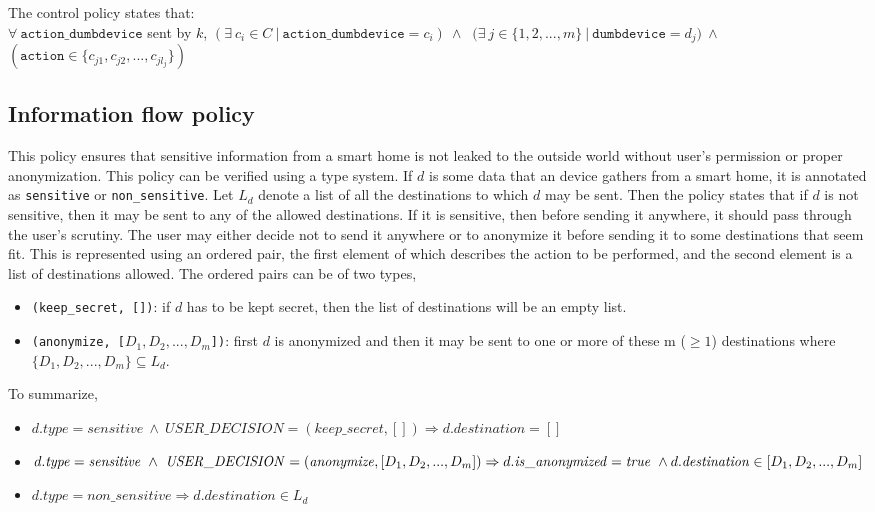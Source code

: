 \documentclass{article}
\begin{document}
\noindent The control policy states that:\\
\noindent $\forall~\mathit{\texttt{action\_dumbdevice}}$ sent by $k$, 
$(\exists~ c_i \in C~|~\texttt{action\_dumbdevice} = c_i)~\wedge~$
$ (\exists~ j \in \{1, 2, ..., m\}~|~ \mathit{\texttt{dumbdevice} = d_j)}~\wedge$\\$(\texttt{action} \in \{c_{j1}, c_{j2}, ..., c_{jl_j}\})$


\subsection{Information flow policy}
\label{subsec:information}
This policy ensures that sensitive information from a smart home is not leaked to the outside world without user's permission or proper anonymization.
This policy can be verified using a type system. If $d$ is some data that an device gathers from a smart home, it is annotated as \texttt{sensitive} or \texttt{non\_sensitive}. 
Let $L_d$ denote a list of all the destinations to which $d$ may be sent. Then the policy states that if $d$ is not sensitive, then it may be sent to any of the allowed destinations. If it is sensitive, then before sending it anywhere, it should pass through the user's scrutiny. The user may either decide not to send it anywhere or to anonymize it before sending it to some destinations that seem fit. This is represented using an ordered pair, the first element of which describes the action to be performed, and the second element is a list of destinations allowed. The ordered pairs can be of two types, \vspace{-7pt}
\begin{itemize}
\itemsep0em 
\item \texttt{(keep\_secret, [])}: if $d$ has to be kept secret, then the list of destinations will be an empty list.
\item \texttt{(anonymize, [$D_1, D_2, ..., D_m$])}: first $d$ is anonymized and then it may be sent to one or more of these m ($\geq1$) destinations where $\{D_1, D_2, ..., D_m\} \subseteq L_d$. 
\end{itemize}\vspace{-5pt}
To summarize, \vspace{-10pt}
\begin{itemize}
\itemsep0em 
\item $d.\mathit{type}= \mathit{sensitive} ~\wedge~ \mathit{USER\_DECISION}= (\mathit{keep\_secret}, []) \Rightarrow d.\mathit{destination} = []$
\item $d.\mathit{type}= \mathit{sensitive} ~ \wedge ~ \mathit{USER\_DECISION}= (\mathit{anonymize}, [{D}_{1}, {D}_{2}, ..., {D}_{m}]) \Rightarrow \\ d.\mathit{is\_{anonymized} = true} ~\wedge~ \\ d.\mathit{destination} \in [{D}_{1}, {D}_{2}, ..., {D}_{m}]$ 
\item $d.\mathit{type}= \mathit{non\_sensitive} \Rightarrow  d.\mathit{destination} \in L_d$ 
\end{itemize}
\end{document}
